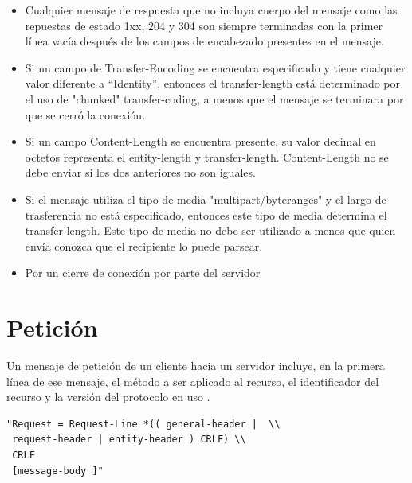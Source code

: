 \begin{description}
\begin{itemize}
\item Cualquier mensaje de respuesta que no incluya cuerpo del mensaje como las repuestas de estado 1xx, 204 y 304 son siempre terminadas con la primer línea vacía después de los campos de encabezado presentes en el mensaje.
\item Si un campo de Transfer-Encoding se encuentra especificado y tiene cualquier valor diferente a “Identity”, entonces el transfer-length está determinado por el uso de "chunked" transfer-coding, a menos que el mensaje se terminara por que se cerró la conexión.
\item Si un campo Content-Length se encuentra presente, su valor decimal en octetos representa el entity-length y transfer-length. Content-Length no se debe enviar si los dos anteriores no son iguales. 
\item Si el mensaje utiliza el tipo de media "multipart/byteranges" y el largo de trasferencia no está especificado, entonces este tipo de media determina el transfer-length. Este tipo de media no debe ser utilizado a menos que quien envía conozca que el recipiente lo puede parsear.
\item Por un cierre de conexión por parte del servidor

\end{itemize}


\end{description}

\section{Petición}
Un mensaje de petición de un cliente hacia un servidor incluye, en la primera línea de ese mensaje, el método a ser aplicado al recurso, el identificador del recurso y la versión del protocolo en uso \cite{rfc2616}.

\begin{verbatim}
"Request = Request-Line *(( general-header |  \\
 request-header | entity-header ) CRLF) \\  
 CRLF
 [message-body ]"
\end{verbatim}

